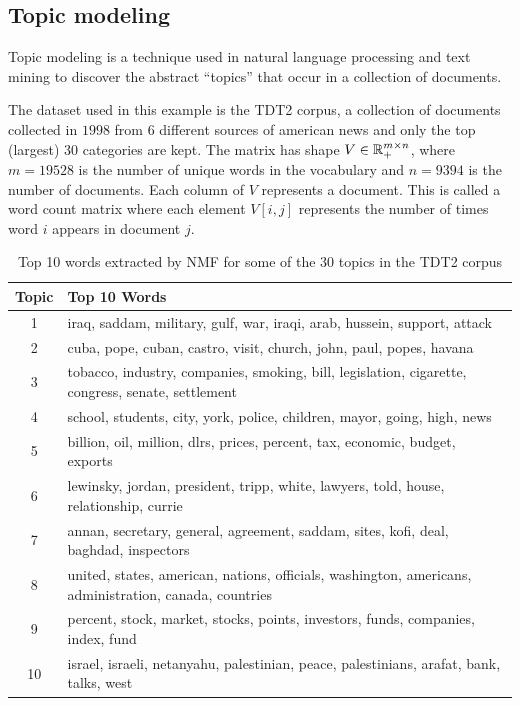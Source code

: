 \subsection{Topic modeling}\label{Topic modeling section}
Topic modeling is a technique used in natural language processing and text mining to discover the abstract ``topics'' that occur in a collection of documents.
\par
The dataset used in this example is the TDT2 corpus, a collection of documents collected in $1998$ \cite{tdt2_corpus} from 6 different sources of american news and only the top (largest) 30 categories are kept. 
The matrix has shape $V \in \mathbb{R}_+^{m \times n}$, where $m = 19528$ is the number of unique words in the vocabulary and $n = 9394$ is the number of documents.
Each column of $V$ represents a document. This is called a word count matrix where each element $V[i,j]$ represents the number of times word $i$ appears in document $j$.
\medskip
\begin{table}[htbp]
\centering
\caption{Top 10 words extracted by NMF for some of the 30 topics in the TDT2 corpus}
\label{tab:nmf_topics}
\begin{tabular}{|c|p{10cm}|}
\hline
\textbf{Topic} & \textbf{Top 10 Words} \\ \hline
1 & iraq, saddam, military, gulf, war, iraqi, arab, hussein, support, attack \\ \hline
2 & cuba, pope, cuban, castro, visit, church, john, paul, popes, havana \\ \hline
3 & tobacco, industry, companies, smoking, bill, legislation, cigarette, congress, senate, settlement \\ \hline
4 & school, students, city, york, police, children, mayor, going, high, news \\ \hline
5 & billion, oil, million, dlrs, prices, percent, tax, economic, budget, exports \\ \hline
6 & lewinsky, jordan, president, tripp, white, lawyers, told, house, relationship, currie \\ \hline
7 & annan, secretary, general, agreement, saddam, sites, kofi, deal, baghdad, inspectors \\ \hline
8 & united, states, american, nations, officials, washington, americans, administration, canada, countries \\ \hline
9 & percent, stock, market, stocks, points, investors, funds, companies, index, fund \\ \hline
10 & israel, israeli, netanyahu, palestinian, peace, palestinians, arafat, bank, talks, west \\ \hline
\end{tabular}
\end{table}

